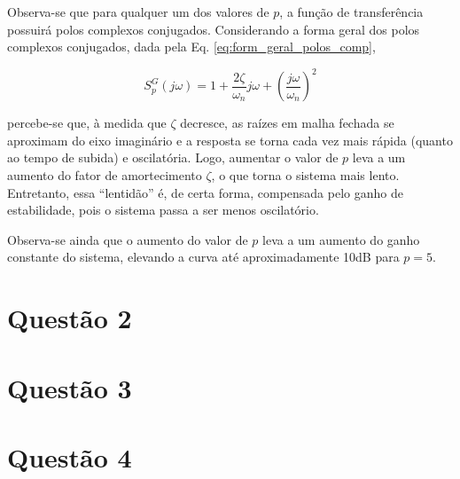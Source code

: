 \documentclass[a4paper,12pt]{article}
\begin{document}
Observa-se que para qualquer um dos valores de $p$, a função de transferência
possuirá polos complexos conjugados. Considerando a forma geral dos polos
complexos conjugados, dada pela Eq. \ref{eq:form_geral_polos_comp}, 

\begin{equation}\label{eq:form_geral_polos_comp}
S_p^G(j\omega) = 1 + 
                 \frac{2\zeta}{\omega_n}j\omega + 
                 \left(\frac{j\omega}{\omega_n}\right)^2
\end{equation}

\noindent percebe-se que, à medida que $\zeta$ decresce, as raízes em malha
fechada se aproximam do eixo imaginário e a resposta se torna cada vez mais
rápida (quanto ao tempo de subida) e oscilatória. Logo, aumentar o valor de $p$
leva a um aumento do fator de amortecimento $\zeta$, o que torna o sistema mais
lento.  Entretanto, essa “lentidão” é, de certa forma, compensada pelo ganho de
estabilidade, pois o sistema passa a ser menos oscilatório.

Observa-se ainda que o aumento do valor de $p$ leva a um aumento do ganho constante
do sistema, elevando a curva até aproximadamente 10dB para $p = 5$.

\pagebreak
\section*{Questão 2}
\pagebreak
\section*{Questão 3}
\pagebreak
\section*{Questão 4}
\end{document}
